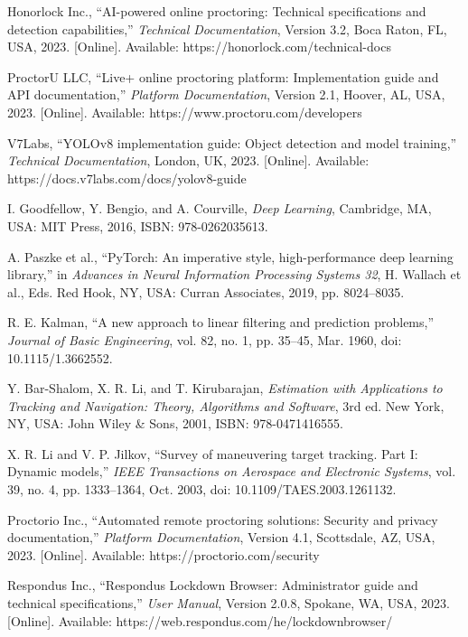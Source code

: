 \documentclass[conference]{IEEEtran}
\begin{document}
\begin{thebibliography}{99}
Honorlock Inc., ``AI-powered online proctoring: Technical specifications and detection capabilities,'' \textit{Technical Documentation}, Version 3.2, Boca Raton, FL, USA, 2023. [Online]. Available: https://honorlock.com/technical-docs

ProctorU LLC, ``Live+ online proctoring platform: Implementation guide and API documentation,'' \textit{Platform Documentation}, Version 2.1, Hoover, AL, USA, 2023. [Online]. Available: https://www.proctoru.com/developers

V7Labs, ``YOLOv8 implementation guide: Object detection and model training,'' \textit{Technical Documentation}, London, UK, 2023. [Online]. Available: https://docs.v7labs.com/docs/yolov8-guide

I. Goodfellow, Y. Bengio, and A. Courville, \textit{Deep Learning}, Cambridge, MA, USA: MIT Press, 2016, ISBN: 978-0262035613.

A. Paszke et al., ``PyTorch: An imperative style, high-performance deep learning library,'' in \textit{Advances in Neural Information Processing Systems 32}, H. Wallach et al., Eds. Red Hook, NY, USA: Curran Associates, 2019, pp. 8024--8035.

R. E. Kalman, ``A new approach to linear filtering and prediction problems,'' \textit{Journal of Basic Engineering}, vol. 82, no. 1, pp. 35--45, Mar. 1960, doi: 10.1115/1.3662552.

Y. Bar-Shalom, X. R. Li, and T. Kirubarajan, \textit{Estimation with Applications to Tracking and Navigation: Theory, Algorithms and Software}, 3rd ed. New York, NY, USA: John Wiley \& Sons, 2001, ISBN: 978-0471416555.

X. R. Li and V. P. Jilkov, ``Survey of maneuvering target tracking. Part I: Dynamic models,'' \textit{IEEE Transactions on Aerospace and Electronic Systems}, vol. 39, no. 4, pp. 1333--1364, Oct. 2003, doi: 10.1109/TAES.2003.1261132.

Proctorio Inc., ``Automated remote proctoring solutions: Security and privacy documentation,'' \textit{Platform Documentation}, Version 4.1, Scottsdale, AZ, USA, 2023. [Online]. Available: https://proctorio.com/security

Respondus Inc., ``Respondus Lockdown Browser: Administrator guide and technical specifications,'' \textit{User Manual}, Version 2.0.8, Spokane, WA, USA, 2023. [Online]. Available: https://web.respondus.com/he/lockdownbrowser/

\end{thebibliography}
\end{document}
